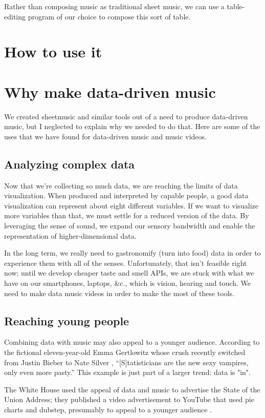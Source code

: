 \documentclass{acm_proc_article-sp}
\begin{document}
Rather than composing music as traditional sheet music,
we can use a table-editing program of our choice to compose
this sort of table.

\section{How to use it}

\section{Why make data-driven music}
We created sheetmusic and similar tools out of a need to produce
data-driven music, but I neglected to explain why we needed to do
that. Here are some of the uses that we have found for data-driven
music and music videos.

\subsection{Analyzing complex data}
Now that we're collecting so much data, we are reaching the limits of
data visualization. When produced and interpreted by capable people,
a good data visualization can represent about eight different variables.
If we want to visualize more variables than that, we must settle for
a reduced version of the data. By leveraging the sense of sound,
we expand our sensory bandwidth and enable the representation of
higher-dimensional data.

In the long term, we really need to gastronomify (turn into food)
data in order to experience them with all of the senses.
Unfortunately, that isn't feasible right now;
until we develop cheaper taste and smell APIs, we are stuck with what we have
on our smartphones, laptops, \&c., which is vision, hearing and touch. We need
to make data music videos in order to make the most of these tools.

\subsection{Reaching young people}
Combining data with music may also appeal to a younger audience.
According to the fictional eleven-year-old Emma Gertlowitz whose crush
recently switched from Justin Bieber to Nate Silver \cite{emma},
``[S]tatisticians are the new sexy vampires, only even more pasty.''
This example is just part of a larger trend: data is "in".

The White House used the appeal of data and music to advertise the State
of the Union Address; they published a video advertisement to YouTube that
used pie charts and dubstep, presumably to appeal to a younger audience \cite{whitehouse}.
\end{document}
